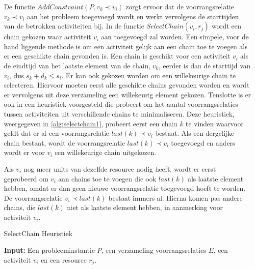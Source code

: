 De functie $AddConstraint(P,v_k \prec v_i)$ zorgt ervoor dat de voorrangsrelatie $v_k \prec v_i$ aan het probleem toegevoegd wordt en werkt vervolgens de starttijden van de betrokken activiteiten bij. In de functie $SelectChain(v_i,r_j)$ wordt een chain gekozen waar activiteit $v_i$ aan toegevoegd zal worden. Een simpele, voor de hand liggende methode is om een activiteit gelijk aan een chain toe te voegen als er een geschikte chain gevonden is. Een chain is geschikt voor een activiteit $v_i$ als de eindtijd van het laatste element van de chain, $v_k$, eerder is dan de starttijd van $v_i$, dus $s_k + d_k \leq s_i$. Er kan ook gekozen worden om een willekeurige chain te selecteren. Hiervoor moeten eerst alle geschikte chains gevonden worden en wordt er vervolgens uit deze verzameling een willekeurig element gekozen. Tenslotte is er ook in \cite{policella2004generating} een heuristiek voorgesteld die probeert om het aantal voorrangsrelaties tussen activiteiten uit verschillende chains te minimaliseren. Deze heuristiek, weergegeven in \ref{alg:selectchain1}, probeert eerst een chain $k$ te vinden waarvoor geldt dat er al een voorrangsrelatie $last(k) \prec v_i$ bestaat. Als een dergelijke chain bestaat, wordt de voorrangsrelatie $last(k) \prec v_i$ toegevoegd en anders wordt er voor $v_i$ een willekeurige chain uitgekozen.

Als $v_i$ nog meer units van dezelfde resource nodig heeft, wordt er eerst geprobeerd om $v_i$ aan chains toe te voegen die ook $last(k)$ als laatste element hebben, omdat er dan geen nieuwe voorrangsrelatie toegevoegd hoeft te worden. De voorrangsrelatie $v_i \prec last(k)$ bestaat immers al. Hierna komen pas andere chains, die $last(k)$ niet als laatste element hebben, in aanmerking voor activiteit $v_i$.

\begin{algorithm}
\caption{SelectChain Heuristiek \cite{policella2004generating}}
\label{alg:selectchain1}
\textbf{Input:} Een probleeminstantie $P$, een verzameling voorrangsrelaties $E$, een activiteit $v_i$ en een resource $r_j$.
\begin{algorithmic}[1]
  	\Else
  	\EndIf
    			\Else
    			\EndIf
    		\EndFor
    	\EndIf
  \EndFunction
\end{algorithmic}
\end{algorithm}

